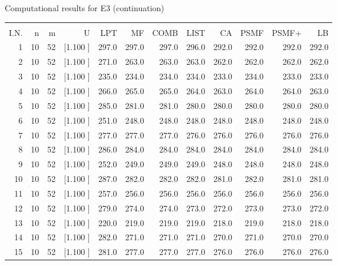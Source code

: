 \documentclass[12pt,a4paper]{article}
\begin{document}
\newpage
\begin{center}
 Computational results for E3 (continuation) {\tiny
\begin{tabular}{r r r r r r r r r r r r}\hline
    &   &   &          &        &        &        &        &        &        &        &       \\[-0.1in]
  I.N.  &  n  &  m  &  U  &  LPT  &  MF  &  COMB  &  LIST  &  CA  & PSMF &PSMF+ & LB \\[0.03in]
\hline
   1& 10& 52&[1.100     ]&   297.0&   297.0&   297.0&   296.0&   292.0&   292.0&   292.0&   292.0\\[-0.02in]
   2& 10& 52&[1.100     ]&   271.0&   263.0&   263.0&   263.0&   262.0&   262.0&   262.0&   262.0\\[-0.02in]
   3& 10& 52&[1.100     ]&   235.0&   234.0&   234.0&   234.0&   233.0&   234.0&   233.0&   233.0\\[-0.02in]
   4& 10& 52&[1.100     ]&   266.0&   265.0&   265.0&   264.0&   263.0&   264.0&   264.0&   263.0\\[-0.02in]
   5& 10& 52&[1.100     ]&   285.0&   281.0&   281.0&   280.0&   280.0&   280.0&   280.0&   280.0\\[-0.02in]
   6& 10& 52&[1.100     ]&   251.0&   248.0&   248.0&   248.0&   248.0&   248.0&   248.0&   248.0\\[-0.02in]
   7& 10& 52&[1.100     ]&   277.0&   277.0&   277.0&   276.0&   276.0&   276.0&   276.0&   276.0\\[-0.02in]
   8& 10& 52&[1.100     ]&   286.0&   284.0&   284.0&   284.0&   284.0&   284.0&   284.0&   284.0\\[-0.02in]
   9& 10& 52&[1.100     ]&   252.0&   249.0&   249.0&   249.0&   248.0&   248.0&   248.0&   248.0\\[-0.02in]
  10& 10& 52&[1.100     ]&   287.0&   282.0&   282.0&   282.0&   281.0&   282.0&   281.0&   281.0\\[-0.02in]
  11& 10& 52&[1.100     ]&   257.0&   256.0&   256.0&   256.0&   256.0&   256.0&   256.0&   256.0\\[-0.02in]
  12& 10& 52&[1.100     ]&   279.0&   274.0&   274.0&   273.0&   272.0&   273.0&   273.0&   272.0\\[-0.02in]
  13& 10& 52&[1.100     ]&   220.0&   219.0&   219.0&   219.0&   218.0&   219.0&   218.0&   218.0\\[-0.02in]
  14& 10& 52&[1.100     ]&   282.0&   271.0&   271.0&   271.0&   270.0&   271.0&   270.0&   270.0\\[-0.02in]
  15& 10& 52&[1.100     ]&   281.0&   277.0&   277.0&   277.0&   276.0&   276.0&   276.0&   276.0\\[-0.02in]

\end{tabular}}
\end{center}
\end{document}
